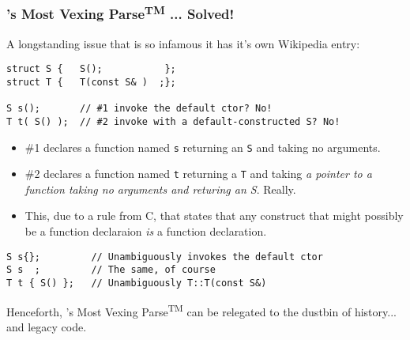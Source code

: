 \begin{frame}[fragile,t]
\frametitle{\CC's Most Vexing Parse\textsuperscript{TM} ... Solved!}
A longstanding issue that is so infamous it has it's own Wikipedia
entry:
{\scriptsize\begin{verbatim}
struct S {   S();           };
struct T {   T(const S& )  ;};

S s();       // #1 invoke the default ctor? No!
T t( S() );  // #2 invoke with a default-constructed S? No!
\end{verbatim}}

\begin{itemize}
\item \#1 declares a function named \texttt{s} returning an \texttt{S}
  and taking no arguments.
\item \#2 declares a function named \texttt{t} returning a \texttt{T}
  and taking \emph{a pointer to
  a function taking no arguments and returing an S}.  Really.
\item This, due to a rule from C, that states that any construct that
  might possibly be a function declaraion \emph{is} a function
  declaration.
\end{itemize}

\begin{verbatim}
S s{};         // Unambiguously invokes the default ctor
S s  ;         // The same, of course
T t { S() };   // Unambiguously T::T(const S&)
\end{verbatim}

Henceforth, \CC's Most Vexing Parse\textsuperscript{TM} can be
relegated to the dustbin of history... and legacy code.
\end{frame}


